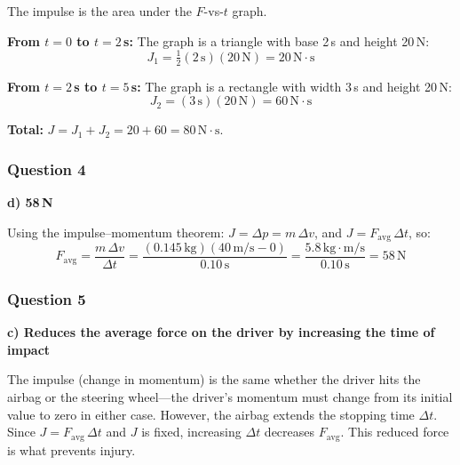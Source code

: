 \documentclass[12pt,letterpaper]{article}
\begin{document}
\begin{explanationbox}
The impulse is the area under the $F$-vs-$t$ graph.

\textbf{From $t=0$ to $t=2$\,s:} The graph is a triangle with base 2\,s and height 20\,N:
\[
J_1 = \tfrac{1}{2}(2\,\text{s})(20\,\text{N}) = 20\,\text{N}\cdot\text{s}
\]

\textbf{From $t=2$\,s to $t=5$\,s:} The graph is a rectangle with width 3\,s and height 20\,N:
\[
J_2 = (3\,\text{s})(20\,\text{N}) = 60\,\text{N}\cdot\text{s}
\]

\textbf{Total:} $J = J_1 + J_2 = 20 + 60 = 80\,\text{N}\cdot\text{s}$.
\end{explanationbox}

\subsubsection*{Question 4}

\begin{answerbox}
\textbf{d) 58\,N}
\end{answerbox}

\begin{explanationbox}
Using the impulse--momentum theorem: $J = \Delta p = m\,\Delta v$, and $J = F_{\text{avg}}\,\Delta t$, so:
\[
F_{\text{avg}} = \frac{m\,\Delta v}{\Delta t} = \frac{(0.145\,\text{kg})(40\,\text{m/s} - 0)}{0.10\,\text{s}} = \frac{5.8\,\text{kg}\cdot\text{m/s}}{0.10\,\text{s}} = 58\,\text{N}
\]
\end{explanationbox}

\subsubsection*{Question 5}

\begin{answerbox}
\textbf{c) Reduces the average force on the driver by increasing the time of impact}
\end{answerbox}

\begin{explanationbox}
The impulse (change in momentum) is the same whether the driver hits the airbag or the steering wheel---the driver's momentum must change from its initial value to zero in either case. However, the airbag extends the stopping time $\Delta t$. Since $J = F_{\text{avg}}\,\Delta t$ and $J$ is fixed, increasing $\Delta t$ decreases $F_{\text{avg}}$. This reduced force is what prevents injury.
\end{explanationbox}
\end{document}
